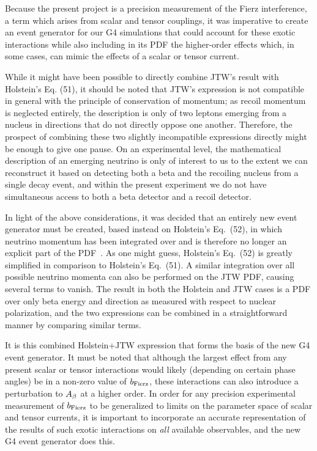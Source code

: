 
Because the present project is a precision measurement of the Fierz interference, a term which arises from scalar and tensor couplings, it was imperative to create an event generator for our G4 simulations that could account for these exotic interactions while also including in its PDF the higher-order effects which, in some cases, can mimic the effects of a scalar or tensor current.  

While it might have been possible to directly combine JTW's result with Holstein's Eq. (51), it should be noted that JTW's expression is not compatible in general with the principle of conservation of momentum;  as recoil momentum is neglected entirely, the description is only of two leptons emerging from a nucleus in directions that do not directly oppose one another.  Therefore, the prospect of combining these two slightly incompatible expressions directly might be enough to give one pause.  On an experimental level, the mathematical description of an emerging neutrino is only of interest to us to the extent we can reconstruct it based on detecting both a beta and the recoiling nucleus from a single decay event, and within the present experiment we do not have simultaneous access to both a beta detector and a recoil detector.  

In light of the above considerations, it was decided that an entirely new event generator must be created, based instead on Holstein's Eq.~(52), in which neutrino momentum has been integrated over and is therefore no longer an explicit part of the PDF~\cite{holstein}.  As one might guess, Holstein's Eq.~(52) is greatly simplified in comparison to Holstein's Eq.~(51).  A similar integration over all possible neutrino momenta can also be performed on the JTW PDF, causing several terms to vanish.  The result in both the Holstein and JTW cases is a PDF over only beta energy and direction as measured with respect to nuclear polarization, and the two expressions can be combined in a straightforward manner by comparing similar terms.  

It is this combined Holstein+JTW expression that forms the basis of the new G4 event generator.  It must be noted that although the largest effect from any present scalar or tensor interactions would likely (depending on certain phase angles) be in a non-zero value of $b_{\mathrm{Fierz}}$, these interactions can also introduce a perturbation to $A_{\beta}$ at a higher order.  In order for any precision experimental measurement of $b_{\mathrm{Fierz}}$ to be generalized to limits on the parameter space of scalar and tensor currents, it is important to incorporate an accurate representation of the results of such exotic interactions on \emph{all} available observables, and the new G4 event generator does this.  

